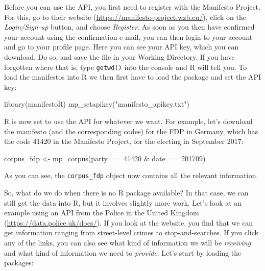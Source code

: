 \documentclass[
]{book}
\newenvironment{Shaded}{\begin{snugshade}}{\end{snugshade}}
\newcommand{\DecValTok}[1]{\textcolor[rgb]{0.00,0.00,0.81}{#1}}
\newcommand{\FunctionTok}[1]{\textcolor[rgb]{0.00,0.00,0.00}{#1}}
\newcommand{\NormalTok}[1]{#1}
\newcommand{\OtherTok}[1]{\textcolor[rgb]{0.56,0.35,0.01}{#1}}
\newcommand{\SpecialCharTok}[1]{\textcolor[rgb]{0.00,0.00,0.00}{#1}}
\newcommand{\StringTok}[1]{\textcolor[rgb]{0.31,0.60,0.02}{#1}}
\begin{document}
Before you can use the API, you first need to register with the Manifesto Project. For this, go to their website (\url{https://manifesto-project.wzb.eu/}), click on the \emph{Login/Sign-up} button, and choose \emph{Register}. As soon as you then have confirmed your account using the confirmation e-mail, you can then login to your account and go to your profile page. Here you can see your API key, which you can download. Do so, and save the file in your Working Directory. If you have forgotten where that is, type \texttt{getwd()} into the console and R will tell you. To load the manifestos into R we then first have to load the package and set the API key:

\begin{Shaded}
\begin{Highlighting}[]
\FunctionTok{library}\NormalTok{(manifestoR)}
\FunctionTok{mp\_setapikey}\NormalTok{(}\StringTok{"manifesto\_apikey.txt"}\NormalTok{)}
\end{Highlighting}
\end{Shaded}

R is now set to use the API for whatever we want. For example, let's download the manifesto (and the corresponding codes) for the FDP in Germany, which has the code 41420 in the Manifesto Project, for the electing in September 2017:

\begin{Shaded}
\begin{Highlighting}[]
\NormalTok{corpus\_fdp }\OtherTok{\textless{}{-}} \FunctionTok{mp\_corpus}\NormalTok{(party }\SpecialCharTok{==} \DecValTok{41420} \SpecialCharTok{\&}\NormalTok{ date }\SpecialCharTok{==} \DecValTok{201709}\NormalTok{)}
\end{Highlighting}
\end{Shaded}

As you can see, the \texttt{corpus\_fdp} object now contains all the relevant information.

So, what do we do when there is no R package available? In that case, we can still get the data into R, but it involves slightly more work. Let's look at an example using an API from the Police in the United Kingdom (\url{https://data.police.uk/docs/}). If you look at the website, you find that we can get information ranging from street-level crimes to stop-and-searches. If you click any of the links, you can also see what kind of information we will be \emph{receiving} and what kind of information we need to \emph{provide}. Let's start by loading the packages:
\end{document}
